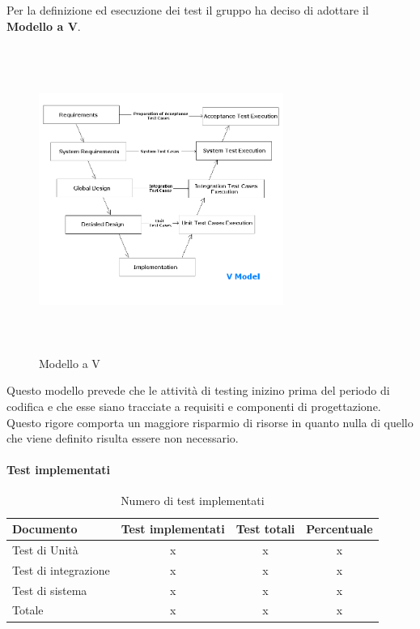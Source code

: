 \documentclass[PdQ.tex]{subfiles}
\begin{document}
\newpage
Per la definizione ed esecuzione dei test il gruppo ha deciso di adottare il \textbf{Modello a V}.

\begin{figure}[htbp]
	\centering
	\includegraphics[height=10cm,width=8cm]{v-model.png}
	\caption{Modello a V}
\end{figure}

Questo modello prevede che le attività di testing inizino prima del periodo di codifica e che esse siano tracciate a requisiti e componenti di progettazione. 
Questo rigore comporta un maggiore risparmio di risorse in quanto nulla di quello che viene definito risulta essere non necessario.



	
	\paragraph{Test implementati}
	\begin{table}[h]
				\centering
				\begin{tabular}{l c c c}
					\hline
					\rule[-0.3cm]{0cm}{0.8cm}
					\textbf{Documento} & \textbf{Test implementati} & \textbf{Test totali} & \textbf{Percentuale}\\
					\hline
					\rule[0cm]{0cm}{0.4cm}
					Test di Unità & x & x & x \\
					\rule[0cm]{0cm}{0.4cm}
					Test di integrazione & x & x & x \\
					\rule[0cm]{0cm}{0.4cm}
					Test di sistema & x & x & x \\
					\rule[0cm]{0cm}{0.4cm}
					Totale & x & x & x \\
					\hline
				\end{tabular}
				\caption{Numero di test implementati}
			\end{table}
			\newpage		
\end{document}
